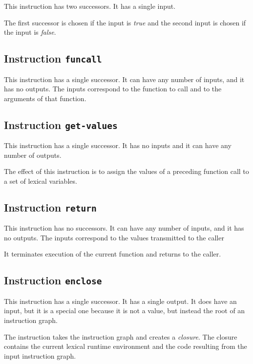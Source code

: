 This instruction has two successors.  It has a single input. 

The first successor is chosen if the input is \emph{true} and the
second input is chosen if the input is \emph{false}.%

\subsection{Instruction \texttt{funcall}}
\label{mir-instruction-funcall}

This instruction has a single successor.  It can have any number of
inputs, and it has no outputs.  The inputs correspond to the function
to call and to the arguments of that function.

\subsection{Instruction \texttt{get-values}}
\label{mir-instruction-get-values}

This instruction has a single successor.  It has no inputs and it can
have any number of outputs.

The effect of this instruction is to assign the values of a preceding
function call to a set of lexical variables. 

\subsection{Instruction \texttt{return}}
\label{mir-instruction-return}

This instruction has no successors.  It can have any number of
inputs, and it has no outputs.  The inputs correspond to the values
transmitted to the caller

It terminates execution of the current function and returns to the
caller. 

\subsection{Instruction \texttt{enclose}}
\label{mir-instruction-enclose}

This instruction has a single successor.  It has a single output. 
It does have an input, but it is a special one because it is not a
value, but instead the root of an instruction graph.  

The instruction takes the instruction graph and creates a
\emph{closure}.  The closure contains the current lexical runtime
environment and the code resulting from the input instruction graph.

